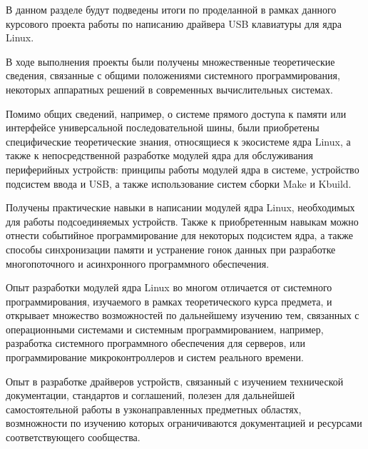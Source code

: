 
В данном разделе будут подведены итоги
по проделанной в рамках данного курсового проекта
работы по написанию драйвера USB клавиатуры
для ядра Linux.

В ходе выполнения проекты были получены множественные
теоретические сведения, связанные с общими положениями
системного программирования, 
некоторых аппаратных решений в современных вычислительных
системах.

Помимо общих сведений, например,
о системе прямого доступа к памяти или
интерфейсе универсальной последовательной шины,
были приобретены специфические теоретические знания,
относящиеся к экосистеме ядра Linux, 
а также к непосредственной разработке 
модулей ядра для обслуживания периферийных устройств:
принципы работы модулей ядра в системе, устройство подсистем ввода и USB,
а также использование систем сборки Make и Kbuild.

Получены практические навыки в написании модулей ядра Linux,
необходимых для работы подсоединяемых устройств.
Также к приобретенным навыкам можно отнести
событийное программирование для некоторых подсистем ядра,
а также способы синхронизации памяти и устранение гонок данных
при разработке многопоточного и асинхронного программного обеспечения.

Опыт разработки модулей ядра Linux во многом отличается
от системного программирования, изучаемого в рамках теоретического
курса предмета, и открывает множество возможностей по дальнейшему изучению
тем, связанных с операционными системами и системным программированием,
например, разработка системного программного обеспечения для серверов,
или программирование микроконтроллеров и систем реального времени.

Опыт в разработке драйверов устройств, связанный с изучением
технической документации, стандартов и соглашений,
полезен для дальнейшей самостоятельной работы
в узконаправленных предметных областях,
возмножности по изучению которых ограничиваются документацией и 
ресурсами соответствующего сообщества.